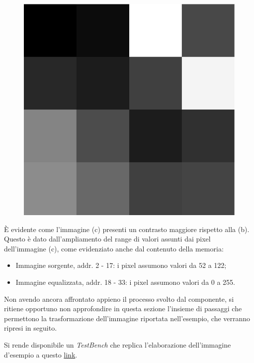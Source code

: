 \documentclass{article}
\begin{document}
\begin{figure}[ht]
\begin{minipage}[c]{.3\linewidth}
        \includegraphics[scale=0.25]{immElab.jpg}
        \label{esempio3}
    \end{minipage}
\end{figure}
\vspace{0.3cm}

È evidente come l'immagine \small (c) \normalsize presenti un contrasto maggiore rispetto alla \small(b)\normalsize. 
Questo è dato dall'ampliamento del range di valori assunti dai pixel dell'immagine \small (c)\normalsize, come evidenziato anche dal contenuto della memoria:
\begin{itemize}
    \item Immagine sorgente, addr. 2 - 17: i pixel assumono valori da 52 a 122;
    \item Immagine equalizzata, addr. 18 - 33: i pixel assumono valori da 0 a 255.
\end{itemize}

Non avendo ancora affrontato appieno il processo svolto dal componente, si ritiene opportuno non approfondire in questa sezione
l'insieme di passaggi che permettono la trasformazione dell'immagine riportata nell'esempio, che verranno ripresi in seguito. \par
Si rende disponibile un \emph{TestBench} che replica l'elaborazione dell'immagine d'esempio a questo \href{https://polimi365-my.sharepoint.com/:f:/g/personal/10628782_polimi_it/EgwOb4V2Oj5Cnx3qEVuZ200BZdZsEs7zgI2Tc3eQFnCPpg?e=h7xHbB}{link}.
\vspace{1cm}
\end{document}
